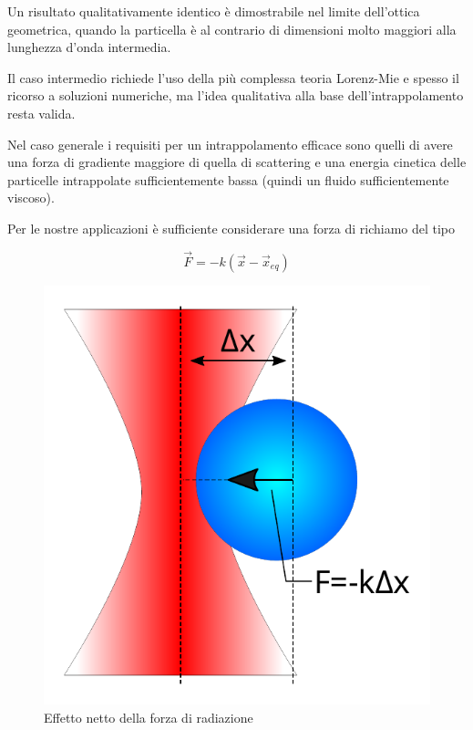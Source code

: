 Un risultato qualitativamente identico è dimostrabile nel limite
dell'ottica geometrica, quando la particella è al contrario di
dimensioni molto maggiori alla lunghezza d'onda intermedia.

Il caso intermedio richiede l'uso della più complessa teoria
Lorenz-Mie e spesso il ricorso a soluzioni numeriche, ma l'idea
qualitativa alla base dell'intrappolamento resta valida.

Nel caso generale i requisiti per un intrappolamento efficace sono
quelli di avere una forza di gradiente maggiore di quella di
scattering e una energia cinetica delle particelle intrappolate
sufficientemente bassa (quindi un fluido sufficientemente viscoso).

Per le nostre applicazioni è sufficiente considerare una forza di
richiamo del tipo 

\begin{equation}
    \vec{F} = -k(\vec{x}-\vec{x}_{eq})
\end{equation}

\begin{figure}[ht]
    \centering
    \includegraphics[scale=.4]{images/fkx.pdf}
    \caption{Effetto netto della forza di radiazione}
    \label{fig:fkx}
\end{figure}

